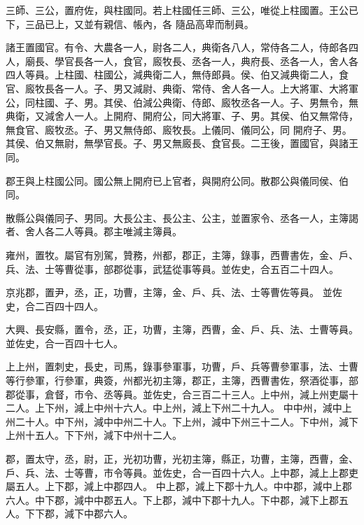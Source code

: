 \begin{pinyinscope}
 三師、三公，置府佐，與柱國同。若上柱國任三師、三公，唯從上柱國置。王公已下，三品已上，又並有親信、帳內，各
 隨品高卑而制員。



 諸王置國官。有令、大農各一人，尉各二人，典衛各八人，常侍各二人，侍郎各四人，廟長、學官長各一人，食官，廄牧長、丞各一人，典府長、丞各一人，舍人各四人等員。上柱國、柱國公，減典衛二人，無侍郎員。侯、伯又減典衛二人，食官、廄牧長各一人。子、男又減尉、典衛、常侍、舍人各一人。上大將軍、大將軍公，同柱國、子、男。其侯、伯減公典衛、侍郎、廄牧丞各一人。子、男無令，無典衛，又減舍人一人。上開府、開府公，同大將軍、子、男。其侯、伯又無常侍，無食官、廄牧丞。子、男又無侍郎、廄牧長。上儀同、儀同公，同
 開府子、男。其侯、伯又無尉，無學官長。子、男又無廄長、食官長。二王後，置國官，與諸王同。



 郡王與上柱國公同。國公無上開府已上官者，與開府公同。散郡公與儀同侯、伯同。



 散縣公與儀同子、男同。大長公主、長公主、公主，並置家令、丞各一人，主簿謁者、舍人各二人等員。郡主唯減主簿員。



 雍州，置牧。屬官有別駕，贊務，州都，郡正，主簿，錄事，西曹書佐，金、戶、兵、法、士等曹從事，部郡從事，武猛從事等員。並佐史，合五百二十四人。



 京兆郡，置尹，丞，正，功曹，主簿，金、戶、兵、法、士等曹佐等員。
 並佐史，合二百四十四人。



 大興、長安縣，置令，丞，正，功曹，主簿，西曹，金、戶、兵、法、士曹等員。並佐史，合一百四十七人。



 上上州，置刺史，長史，司馬，錄事參軍事，功曹，戶、兵等曹參軍事，法、士曹等行參軍，行參軍，典簽，州都光初主簿，郡正，主簿，西曹書佐，祭酒從事，部郡從事，倉督，市令、丞等員。並佐史，合三百二十三人。上中州，減上州吏屬十二人。上下州，減上中州十六人。中上州，減上下州二十九人。
 中中州，減中上州二十人。中下州，減中中州二十人。下上州，減中下州三十二人。下中州，減下上州十五人。下下州，減下中州十二人。



 郡，置太守，丞，尉，正，光初功曹，光初主簿，縣正，功曹，主簿，西曹，金、戶、兵、法、士等曹，市令等員。並佐史，合一百四十六人。上中郡，減上上郡吏屬五人。上下郡，減上中郡四人。
 中上郡，減上下郡十九人。中中郡，減中上郡六人。中下郡，減中中郡五人。下上郡，減中下郡十九人。下中郡，減下上郡五人。下下郡，減下中郡六人。




\end{pinyinscope}
